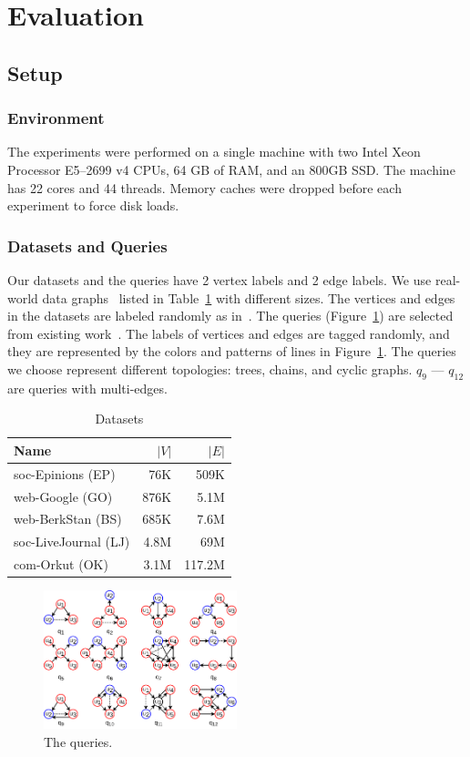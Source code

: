 \section{Evaluation}\label{sec:experiments}
\subsection{Setup}
\subsubsection{Environment}
The experiments were performed on a single machine with two Intel Xeon Processor E5--2699 v4 CPUs, 64 GB of RAM,
and an 800GB SSD\@.
The machine has 22 cores and 44 threads.
Memory caches were dropped before each experiment to force disk loads.
\subsubsection{Datasets and Queries}
Our datasets and the queries have 2 vertex labels and 2 edge labels.
We use real-world data graphs~\cite{snapnets} listed in Table~\ref{tab:datasets} with different sizes. The vertices and edges in the datasets are labeled randomly as in~\cite{DBLP:journals/pvldb/MhedhbiS19}.
The queries (Figure~\ref{img:queries}) are selected from existing work~\cite{DBLP:conf/cloud/SerafiniMS17,DBLP:journals/pvldb/MhedhbiS19}.
The labels of vertices and edges are tagged randomly,
and they are represented by the colors and patterns of lines in Figure~\ref{img:queries}.
The queries we choose represent different topologies: trees, chains, and cyclic graphs.
$q_9$ --- $q_{12}$ are queries with multi-edges.
\begin{table}
  \caption{Datasets}\label{tab:datasets}
  \begin{tabular}{lrr}
    \toprule
    Name & $|V|$ & $|E|$ \\
    \midrule
    soc-Epinions (EP) & 76K & 509K \\
    web-Google (GO) & 876K & 5.1M \\
    web-BerkStan (BS) & 685K & 7.6M \\
    soc-LiveJournal (LJ) & 4.8M & 69M \\
    com-Orkut (OK) & 3.1M & 117.2M \\
    \bottomrule
  \end{tabular}
\end{table}

\begin{figure}[ht]
  \centering
  \includegraphics[width=0.5\textwidth]{img/queries.pdf}
  \caption{The queries.}\label{img:queries}
\end{figure}

